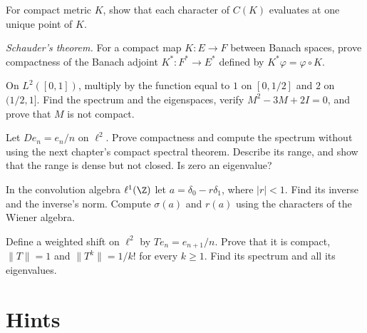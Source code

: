 \begin{exercise}[$\star$]\label{ex:ckcharacters}
For compact metric $K$, show that each character of $C(K)$ evaluates at one unique point of $K$.
\end{exercise}
\begin{exercise}[$\star\star\star$]\label{ex:schauder}
\emph{Schauder's theorem.} For a compact map $K:E\to F$ between Banach spaces, prove compactness of the Banach adjoint $K^*:F^*\to E^*$ defined by $K^*\varphi=\varphi\circ K$.
\end{exercise}

\begin{exercise}[$\star\star$]\label{ex:v8c08a}
On $L^2([0,1])$, multiply by the function equal to $1$ on $[0,1/2]$ and $2$ on $(1/2,1]$. Find the spectrum and the eigenspaces, verify $M^2-3M+2I=0$, and prove that $M$ is not compact.
\end{exercise}
\begin{exercise}[$\star\star$]\label{ex:v8c08b}
Let $De_n=e_n/n$ on $\ell^2$. Prove compactness and compute the spectrum without using the next chapter's compact spectral theorem. Describe its range, and show that the range is dense but not closed. Is zero an eigenvalue?
\end{exercise}
\begin{exercise}[$\star\star$]\label{ex:v8c08c}
In the convolution algebra $\ell^1(\Z)$ let $a=\delta_0-r\delta_1$, where $|r|<1$. Find its inverse and the inverse's norm. Compute $\sigma(a)$ and $r(a)$ using the characters of the Wiener algebra.
\end{exercise}
\begin{exercise}[$\star\star$]\label{ex:v8c08d}
Define a weighted shift on $\ell^2$ by $Te_n=e_{n+1}/n$. Prove that it is compact, $\|T\|=1$ and $\|T^k\|=1/k!$ for every $k\ge1$. Find its spectrum and all its eigenvalues.
\end{exercise}

\section{Hints}

